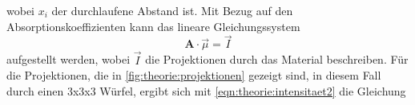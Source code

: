     wobei $x_i$ der durchlaufene Abstand ist.
    Mit Bezug auf den Absorptionskoeffizienten kann das lineare Gleichungssystem
    \begin{equation}
        \symbf{A} \cdot \vec{\mu} = \vec{I}
    \end{equation}
    aufgestellt werden,
    wobei $\vec{I}$ die Projektionen durch das Material beschreiben.
    Für die Projektionen,
    die in \autoref{fig:theorie:projektionen} gezeigt sind,
    in diesem Fall durch einen 3x3x3 Würfel,
    ergibt sich mit \autoref{eqn:theorie:intensitaet2} die Gleichung
